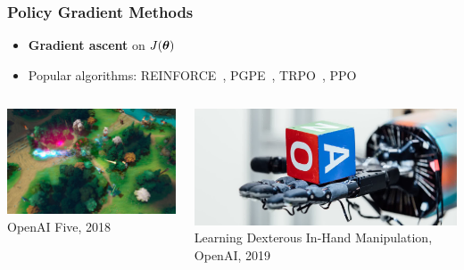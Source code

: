 \documentclass[aspectratio=169, table]{beamer}
\newcommand{\enb}[1]{\textcolor{poliblue1}{\textbf{#1}}}
\begin{document}
\begin{frame}
\frametitle{Policy Gradient Methods}
\begin{itemize}
	\item \enb{Gradient ascent} on $J(\boldsymbol{\theta})$
	\item Popular algorithms: REINFORCE~\cite{williams1992simple},
	PGPE~\cite{sehnke2008policy},
	TRPO~\cite{schulman2015trust}, PPO~\cite{schulman2017proximal}
\end{itemize}
\vspace{.5cm}
\begin{columns}
	\begin{column}{.4\textwidth}
		\includegraphics[width=\textwidth]{dota.jpg}
		\centering
		OpenAI Five, 2018
	\end{column}
	\hfill
	\begin{column}{.55\textwidth}
		\vspace{.5cm}
		\includegraphics[width=\textwidth]{hand.jpg}
		\centering
		Learning Dexterous In-Hand Manipulation, OpenAI, 2019
	\end{column}
\end{columns}
\end{frame}
\end{document}
